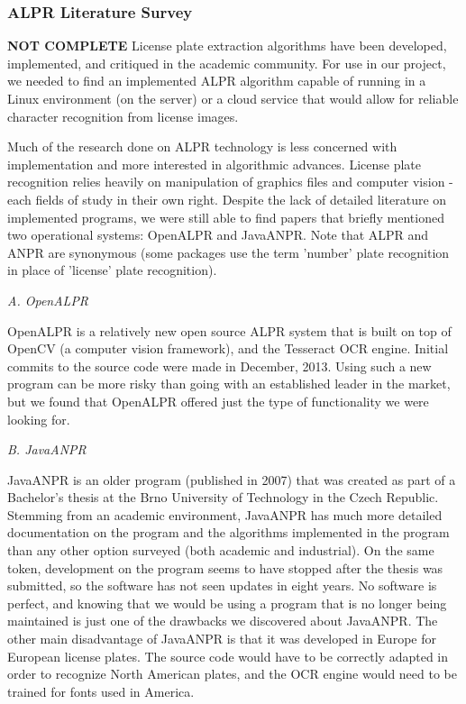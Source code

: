 \documentclass[11pt, oneside, fullpage, doublespace]{article}
\begin{document}
\subsubsection{ALPR Literature Survey}
{\color{red}\textbf{NOT COMPLETE}}
License plate extraction algorithms have been developed, implemented, and critiqued in the academic community. For use in our project, we needed to find an implemented ALPR algorithm capable of running in a Linux environment (on the server) or a cloud service that would allow for reliable character recognition from license images.

Much of the research done on ALPR technology is less concerned with implementation and more interested in algorithmic advances. License plate recognition relies heavily on manipulation of graphics files and computer vision - each fields of study in their own right. Despite the lack of detailed literature on implemented programs, we were still able to find papers that briefly mentioned two operational systems: OpenALPR and JavaANPR. Note that ALPR and ANPR are synonymous (some packages use the term 'number' plate recognition in place of 'license' plate recognition).

\emph{A. OpenALPR}

OpenALPR is a relatively new open source ALPR system that is built on top of OpenCV (a computer vision framework), and the Tesseract OCR engine. Initial commits to the source code were made in December, 2013. Using such a new program can be more risky than going with an established leader in the market, but we found that OpenALPR offered just the type of functionality we were looking for.

\emph{B. JavaANPR}

JavaANPR is an older program (published in 2007) that was created as part of a Bachelor's thesis at the Brno University of Technology in the Czech Republic. Stemming from an academic environment, JavaANPR has much more detailed documentation on the program and the algorithms implemented in the program than any other option surveyed (both academic and industrial). On the same token, development on the program seems to have stopped after the thesis was submitted, so the software has not seen updates in eight years. No software is perfect, and knowing that we would be using a program that is no longer being maintained is just one of the drawbacks we discovered about JavaANPR. The other main disadvantage of JavaANPR is that it was developed in Europe for European license plates. The source code would have to be correctly adapted in order to recognize North American plates, and the OCR engine would need to be trained for fonts used in America.
\end{document}
